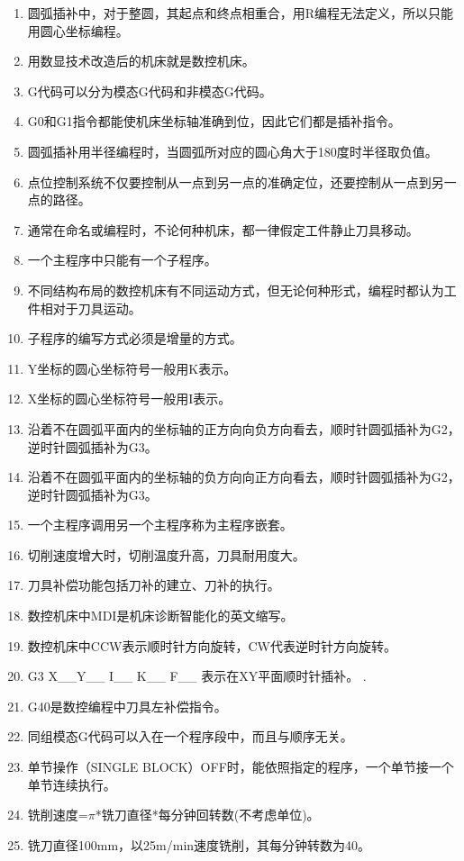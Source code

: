 \documentclass[12pt,twocolumn,landscape,UTF8,twoside]{ctexart}
\begin{document}
\begin{spacing}{1.3}
\begin{enumerate} [1、]
\item 圆弧插补中，对于整圆，其起点和终点相重合，用R编程无法定义，所以只能用圆心坐标编程。
\item 用数显技术改造后的机床就是数控机床。
\item G代码可以分为模态G代码和非模态G代码。
\item G0和G1指令都能使机床坐标轴准确到位，因此它们都是插补指令。
\item 圆弧插补用半径编程时，当圆弧所对应的圆心角大于180度时半径取负值。
\item 点位控制系统不仅要控制从一点到另一点的准确定位，还要控制从一点到另一点的路径。
\item 通常在命名或编程时，不论何种机床，都一律假定工件静止刀具移动。
\item 一个主程序中只能有一个子程序。
\item 不同结构布局的数控机床有不同运动方式，但无论何种形式，编程时都认为工件相对于刀具运动。
\item 子程序的编写方式必须是增量的方式。
\item Y坐标的圆心坐标符号一般用K表示。
\item X坐标的圆心坐标符号一般用I表示。
\item 沿着不在圆弧平面内的坐标轴的正方向向负方向看去，顺时针圆弧插补为G2，逆时针圆弧插补为G3。
\item 沿着不在圆弧平面内的坐标轴的负方向向正方向看去，顺时针圆弧插补为G2，逆时针圆弧插补为G3。
\item 一个主程序调用另一个主程序称为主程序嵌套。
\item 切削速度增大时，切削温度升高，刀具耐用度大。
\item 刀具补偿功能包括刀补的建立、刀补的执行。
\item 数控机床中MDI是机床诊断智能化的英文缩写。
\item 数控机床中CCW表示顺时针方向旋转，CW代表逆时针方向旋转。
\item G3 X\_\_Y\_\_ I\_\_ K\_\_ F\_\_ 表示在XY平面顺时针插补。
.\item G40是数控编程中刀具左补偿指令。
\item 同组模态G代码可以入在一个程序段中，而且与顺序无关。
\item 单节操作（SINGLE BLOCK）OFF时，能依照指定的程序，一个单节接一个单节连续执行。
\item 铣削速度=$\pi$*铣刀直径*每分钟回转数(不考虑单位)。
\item 铣刀直径100mm，以25m/min速度铣削，其每分钟转数为40。

\end{enumerate}
\end{spacing}
\end{document}
